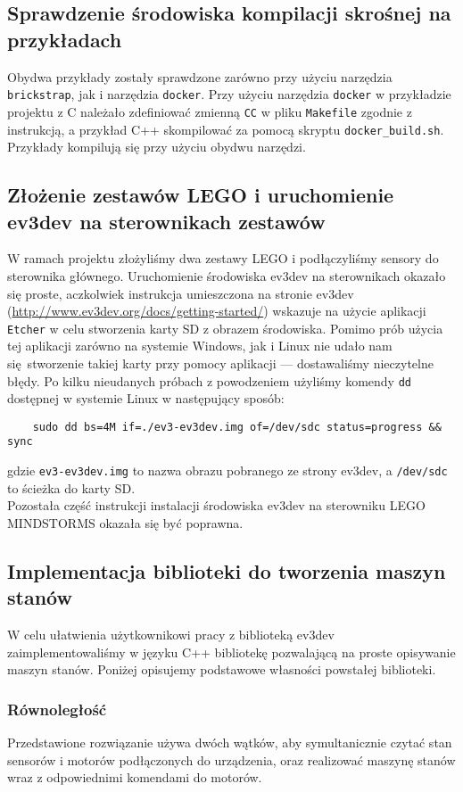 \documentclass{article}
\begin{document}
\subsection{Sprawdzenie środowiska kompilacji skrośnej na przykładach}
Obydwa przykłady zostały sprawdzone zarówno przy użyciu narzędzia
\texttt{brickstrap}, jak i narzędzia \texttt{docker}.
Przy użyciu narzędzia \texttt{docker} w przykładzie projektu z C należało
zdefiniować zmienną \texttt{CC} w pliku \texttt{Makefile} zgodnie z instrukcją,
a przykład C++ skompilować za pomocą skryptu \texttt{docker\_build.sh}.
Przykłady kompilują się przy użyciu obydwu narzędzi.
\subsection{Złożenie zestawów LEGO i uruchomienie ev3dev na sterownikach
    zestawów}
W ramach projektu złożyliśmy dwa zestawy LEGO i podłączyliśmy sensory do
sterownika głównego. Uruchomienie środowiska ev3dev na sterownikach okazało się
proste, aczkolwiek instrukcja umieszczona na stronie ev3dev
(\url{http://www.ev3dev.org/docs/getting-started/}) wskazuje na użycie aplikacji
\texttt{Etcher} w celu stworzenia karty SD z obrazem środowiska. Pomimo prób
użycia tej aplikacji zarówno na systemie Windows, jak i Linux nie udało nam
się stworzenie takiej karty przy pomocy aplikacji --- dostawaliśmy nieczytelne
błędy. Po kilku nieudanych próbach z powodzeniem użyliśmy komendy \texttt{dd}
dostępnej w systemie Linux w następujący sposób:
\begin{verbatim}
    sudo dd bs=4M if=./ev3-ev3dev.img of=/dev/sdc status=progress && sync
\end{verbatim}
gdzie \texttt{ev3-ev3dev.img} to nazwa obrazu pobranego ze strony ev3dev, a
\texttt{/dev/sdc} to ścieżka do karty SD.\\
Pozostała część instrukcji instalacji środowiska ev3dev na sterowniku LEGO
MINDSTORMS okazała się być poprawna.
\subsection{Implementacja biblioteki do tworzenia maszyn stanów}
W celu ułatwienia użytkownikowi pracy z biblioteką ev3dev zaimplementowaliśmy w
języku C++ bibliotekę pozwalającą na proste opisywanie maszyn stanów. Poniżej
opisujemy podstawowe własności powstałej biblioteki.
\subsubsection*{Równoległość}
Przedstawione rozwiązanie używa dwóch wątków, aby symultanicznie czytać stan
sensorów i motorów podłączonych do urządzenia, oraz realizować maszynę stanów
wraz z odpowiednimi komendami do motorów.
\end{document}

